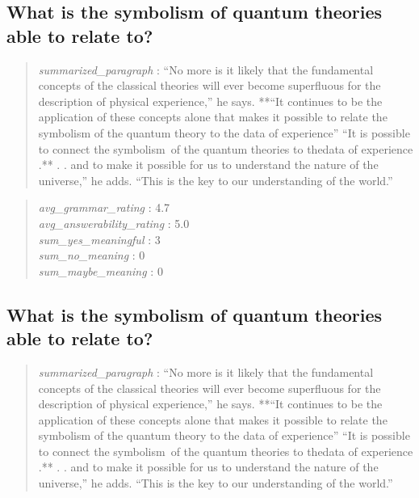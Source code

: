 \hypertarget{what-is-the-symbolism-of-quantum-theories-able-to-relate-to}{%
\subsection{What is the symbolism of quantum theories able to relate
to?}\label{what-is-the-symbolism-of-quantum-theories-able-to-relate-to}}

\begin{quote}
\emph{summarized\_paragraph} : ``No more is it likely that the
fundamental concepts of the classical theories will ever become
superfluous for the description of physical experience,'' he says.
**``It continues to be the application of these concepts alone that
makes it possible to relate the symbolism of the quantum theory to the
data of experience'' ``It is possible to connect the symbolism~of the
quantum theories to thedata of experience .** . . and to make it
possible for us to understand the nature of the universe,'' he adds.
``This is the key to our understanding of the world.''
\end{quote}

\begin{quote}
\emph{avg\_grammar\_rating} : 4.7\\
\emph{avg\_answerability\_rating} : 5.0\\
\emph{sum\_yes\_meaningful} : 3\\
\emph{sum\_no\_meaning} : 0\\
\emph{sum\_maybe\_meaning} : 0
\end{quote}

\hypertarget{what-is-the-symbolism-of-quantum-theories-able-to-relate-to-1}{%
\subsection{What is the symbolism of quantum theories able to relate
to?}\label{what-is-the-symbolism-of-quantum-theories-able-to-relate-to-1}}

\begin{quote}
\emph{summarized\_paragraph} : ``No more is it likely that the
fundamental concepts of the classical theories will ever become
superfluous for the description of physical experience,'' he says.
**``It continues to be the application of these concepts alone that
makes it possible to relate the symbolism of the quantum theory to the
data of experience'' ``It is possible to connect the symbolism~of the
quantum theories to thedata of experience .** . . and to make it
possible for us to understand the nature of the universe,'' he adds.
``This is the key to our understanding of the world.''
\end{quote}

